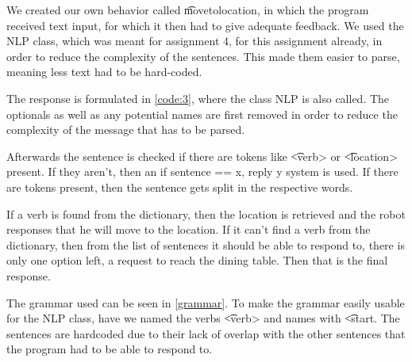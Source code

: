 
We created our own behavior called \t{movetolocation}, in which the program received text input, for which it then had to give adequate feedback. We used the NLP class, which was meant for assignment 4, for this assignment already, in order to reduce the complexity of the sentences. This made them easier to parse, meaning less text had to be hard-coded.



The response is formulated in \cref{code:3}, where the class NLP is also called. The optionals as well as any potential names are first removed in order to reduce the complexity of the message that has to be parsed. 

Afterwards the sentence is checked if there are tokens like \t{<verb>} or \t{<location>} present. If they aren't, then an if sentence == x, reply y system is used. If there are tokens present, then the sentence gets split in the respective words. 

If a verb is found from the dictionary, then the location is retrieved and the robot responses that he will move to the location. If it can't find a verb from the dictionary, then from the list of sentences it should be able to respond to, there is only one option left, a request to reach the dining table. Then that is the final response.



The grammar used can be seen in \cref{grammar}. To make the grammar easily usable for the NLP class, have we named the verbs \t{<verb>} and names with \t{<start}. The sentences are hardcoded due to their lack of overlap with the other sentences that the program had to be able to respond to.